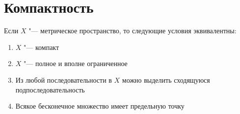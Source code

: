 \documentclass[main]{subfiles}
\begin{document}
\section{Компактность}

\begin{theorem}\label{thm:compact}
  Если \( X \) "--- метрическое пространство,
  то следующие условия эквивалентны:
  \begin{enumerate}
    \item \( X \) "--- компакт
    \item \( X \) "--- полное и вполне ограниченное
    \item Из любой последовательности в \( X \)
      можно выделить сходящуюся подпоследовательность
    \item Всякое бесконечное множество имеет предельную точку
  \end{enumerate}
\end{theorem}
\end{document}
